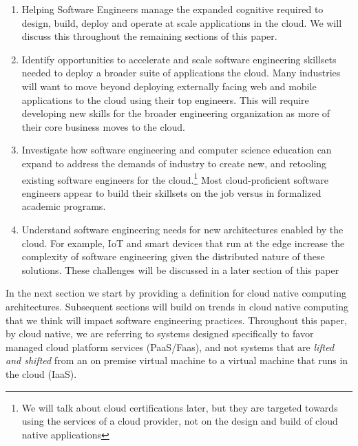 \documentclass[conference]{IEEEconf}
\begin{document}
\begin{enumerate}
	\item \vspace{-0.2cm}Helping Software Engineers manage the expanded cognitive required to design, build, deploy and operate at scale  applications in the cloud. We will discuss this throughout the remaining sections of this paper. 
	
	\item \vspace{-0.2cm}Identify opportunities to accelerate and scale software engineering skillsets needed to deploy a broader suite of applications the cloud. Many industries will want to move beyond deploying externally facing web and mobile applications to the cloud using their top engineers. This will require developing new skills for the broader engineering organization as more of their core business moves to the cloud.
	
	\item \vspace{-0.2cm}Investigate how software engineering and computer science education can expand to address the demands of industry to create new, and retooling existing software engineers for the cloud.\footnote{We will talk about cloud certifications later, but they are targeted towards using the services of a cloud provider, not on the design and build of cloud native applications} Most cloud-proficient software engineers appear to build their skillsets on the job versus in formalized academic programs. 
	
	\item \vspace{-0.2cm}Understand software engineering needs for new architectures enabled by the cloud.  For example, IoT and smart devices that run at the edge increase the complexity of software engineering given the  distributed nature of these solutions.  These challenges will be discussed in a later section of this paper
\end{enumerate}

In the next section we start by providing a definition for cloud native computing architectures. Subsequent sections will build on trends in cloud native computing that we think will impact software engineering practices.  Throughout this paper, by cloud native, we are referring to systems designed specifically to favor managed cloud platform services (PaaS/Faas)\cite{albuquerque2017function}, and not systems that are \textit{lifted and shifted}\cite{CloudMigration2017} from an on premise virtual machine to a virtual machine that runs in the cloud (IaaS). 
\end{document}
